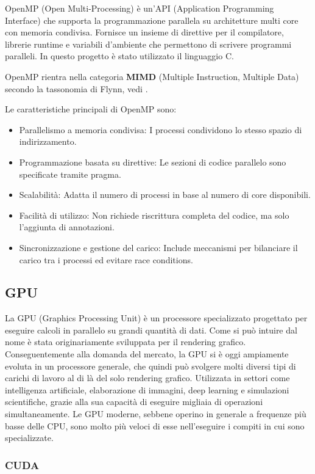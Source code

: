 \documentclass[12pt,a4paper]{report}
\begin{document}
OpenMP (Open Multi-Processing) è un'API (Application
Programming Interface) che supporta la programmazione parallela su architetture multi core con memoria condivisa.
Fornisce un insieme di direttive per il compilatore, librerie runtime e variabili d'ambiente che permettono di scrivere programmi
paralleli.
In questo progetto è stato utilizzato il linguaggio C.

OpenMP rientra nella categoria \textbf{MIMD} (Multiple Instruction, Multiple Data) secondo la tassonomia di Flynn, vedi
\cite{Flynn1966}.

Le caratteristiche principali di OpenMP sono:
\begin{itemize}
  \item Parallelismo a memoria condivisa: I processi condividono lo stesso spazio di indirizzamento.
  \item Programmazione basata su direttive: Le sezioni di codice parallelo sono specificate tramite pragma.
  \item Scalabilità: Adatta il numero di processi in base al numero di core disponibili.
  \item Facilità di utilizzo: Non richiede riscrittura completa del codice, ma solo l'aggiunta di annotazioni.
  \item Sincronizzazione e gestione del carico: Include meccanismi per bilanciare il carico tra i processi ed evitare race
        conditions.
\end{itemize}

\subsection{GPU}

La GPU (Graphics Processing Unit) è un processore specializzato progettato per eseguire calcoli in parallelo su grandi quantità di
dati.
Come si può intuire dal nome è stata originariamente sviluppata per il rendering grafico.
Conseguentemente alla domanda del mercato, la GPU si è oggi ampiamente evoluta in un processore generale, che quindi può svolgere
molti diversi tipi di carichi di lavoro al di là del solo rendering grafico.
Utilizzata in settori come intelligenza artificiale, elaborazione di immagini, deep learning e simulazioni scientifiche, grazie
alla sua capacità di eseguire migliaia di operazioni simultaneamente.
Le GPU moderne, sebbene operino in generale a frequenze più basse delle CPU, sono molto più veloci di esse nell'eseguire i compiti
in cui sono specializzate.

\subsubsection{CUDA}
\end{document}
